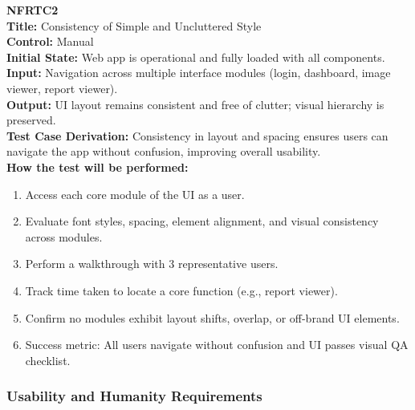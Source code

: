 \documentclass[12pt, titlepage]{article}
\begin{document}
\vspace{1em}
\textbf{NFRTC2}\\
\textbf{Title:} Consistency of Simple and Uncluttered Style\\
\textbf{Control:} Manual\\
\textbf{Initial State:} Web app is operational and fully loaded with all components.\\
\textbf{Input:} Navigation across multiple interface modules (login, dashboard, image viewer, report viewer).\\
\textbf{Output:} UI layout remains consistent and free of clutter; visual hierarchy is preserved.\\
\textbf{Test Case Derivation:} Consistency in layout and spacing ensures users can navigate the app without confusion, improving overall usability.\\
\textbf{How the test will be performed:}
\begin{enumerate}
  \item Access each core module of the UI as a user.
  \item Evaluate font styles, spacing, element alignment, and visual consistency across modules.
  \item Perform a walkthrough with 3 representative users.
  \item Track time taken to locate a core function (e.g., report viewer).
  \item Confirm no modules exhibit layout shifts, overlap, or off-brand UI elements.
  \item Success metric: All users navigate without confusion and UI passes visual QA checklist.
\end{enumerate}

\vspace{1em}
\subsubsection{Usability and Humanity Requirements}
\end{document}
